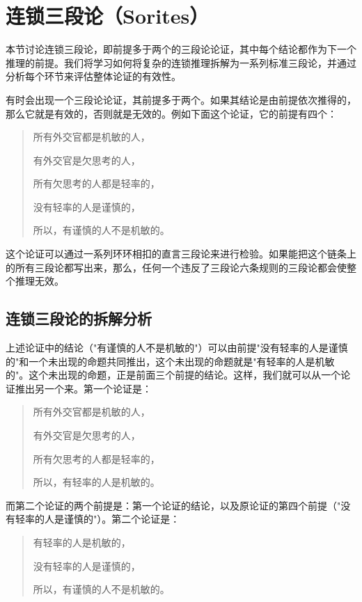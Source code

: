 \section{连锁三段论（Sorites）}

\begin{logicbox}[title=引言]
本节讨论连锁三段论，即前提多于两个的三段论论证，其中每个结论都作为下一个推理的前提。我们将学习如何将复杂的连锁推理拆解为一系列标准三段论，并通过分析每个环节来评估整体论证的有效性。
\end{logicbox}

有时会出现一个三段论论证，其前提多于两个。如果其结论是由前提依次推得的，那么它就是有效的，否则就是无效的。例如下面这个论证，它的前提有四个：

\begin{quote}
所有外交官都是机敏的人，

有外交官是欠思考的人，

所有欠思考的人都是轻率的，

没有轻率的人是谨慎的，

所以，有谨慎的人不是机敏的。
\end{quote}

这个论证可以通过一系列环环相扣的直言三段论来进行检验。如果能把这个链条上的所有三段论都写出来，那么，任何一个违反了三段论六条规则的三段论都会使整个推理无效。

\subsection{连锁三段论的拆解分析}

上述论证中的结论（"有谨慎的人不是机敏的"）可以由前提"没有轻率的人是谨慎的"和一个未出现的命题共同推出，这个未出现的命题就是"有轻率的人是机敏的"。这个未出现的命题，正是前面三个前提的结论。这样，我们就可以从一个论证推出另一个来。第一个论证是：

\begin{quote}
所有外交官都是机敏的人，

有外交官是欠思考的人，

所有欠思考的人都是轻率的，

所以，有轻率的人是机敏的。
\end{quote}

而第二个论证的两个前提是：第一个论证的结论，以及原论证的第四个前提（"没有轻率的人是谨慎的"）。第二个论证是：

\begin{quote}
有轻率的人是机敏的，

没有轻率的人是谨慎的，

所以，有谨慎的人不是机敏的。
\end{quote}

